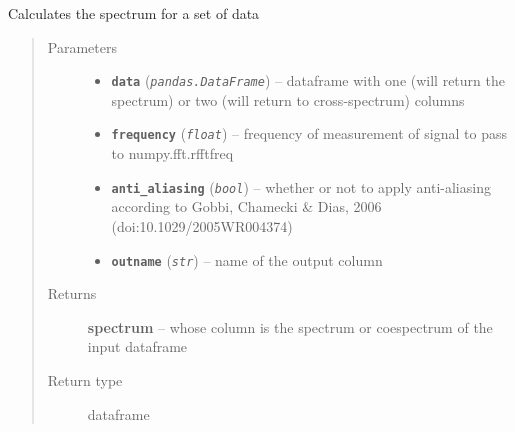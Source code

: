 \documentclass[a4paper,10pt,oneside]{sphinxmanual}
\begin{document}

\begin{fulllineitems}
\label{pymicra:pymicra.data.spectrum}
Calculates the spectrum for a set of data
\begin{quote}\begin{description}
\item[{Parameters}] \leavevmode\begin{itemize}
\item {} 
\textbf{\texttt{data}} (\emph{\texttt{pandas.DataFrame}}) -- dataframe with one (will return the spectrum) or two (will return to cross-spectrum) columns

\item {} 
\textbf{\texttt{frequency}} (\emph{\texttt{float}}) -- frequency of measurement of signal to pass to numpy.fft.rfftfreq

\item {} 
\textbf{\texttt{anti\_aliasing}} (\emph{\texttt{bool}}) -- whether or not to apply anti-aliasing according to Gobbi, Chamecki \& Dias, 2006 (doi:10.1029/2005WR004374)

\item {} 
\textbf{\texttt{outname}} (\emph{\texttt{str}}) -- name of the output column

\end{itemize}

\item[{Returns}] \leavevmode
\textbf{spectrum} -- whose column is the spectrum or coespectrum of the input dataframe

\item[{Return type}] \leavevmode
dataframe

\end{description}\end{quote}

\end{fulllineitems}

\end{document}
